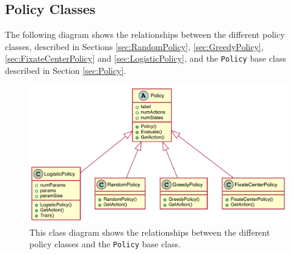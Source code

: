 \FloatBarrier

\subsection{Policy Classes}
The following diagram shows the relationships between the different policy classes, described in Sections \ref{sec:RandomPolicy}, \ref{sec:GreedyPolicy}, \ref{sec:FixateCenterPolicy} and \ref{sec:LogisticPolicy}, and the \texttt{Policy} base class described in Section \ref{sec:Policy}.

\begin{figure}[tb]
  \centering
  \includegraphics[width=1\textwidth]{figures/PolicyClasses}
  \caption{This class diagram shows the relationships between the different policy classes and the \texttt{Policy} base class.}
  \label{fig:PolicyClasses}
\end{figure}

